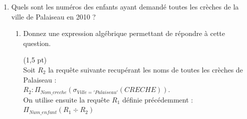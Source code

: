 \begin{enumerate}
  \begin{enumerate}
      \item Donnez une expression alg\'ebrique permettant de r\'epondre \`a cette
    question.
\begin{correction} (1 pt)\\
	Soit la requ\^ete $R$ suivante, jointure des relations $ENFANT$ et $ACCUEIL$:\\
      $R : ENFANT
      \Join_{ENFANT.Num\_enfant=ACCUEIL.Num\_enfant} ACCUEIL$\\
      Attention ici dans $R$, la
      jointure ne doit pas \^etre naturelle \`a cause de l'attribut \texttt{Annee} sur lequel on ne veut pas joindre !\\
      Une correction est $\pi_{Nom,Prenom}(\sigma_{ENFANT.Annee=2009}(R))$.\\
      ou \\ (avec renommage explicite pour pouvoir effectuer
      une jointure naturelle) : \\$\sigma_{Annee\_naiss=2009}(\rho_{Annee
      \rightarrow Annee\_naiss}(ENFANT) \Join ACCUEIL)$\\
  ou encore \\
      $\pi_{Nom,Prenom}(\pi_{Num\_enfant,
      Nom, Prenom}(\sigma_{Annee=2009}(ENFANT))) \Join ACCUEIL)$.
\end{correction} 
    \item Donnez une requ\^ete SQL permettant de
    r\'epondre \`a cette question.
\begin{correction} (1 pt)
      \begin{lstlisting}[language=SQL]
Select ENFANT.Nom, ACCUEIL.Prenom
From ENFANT, ACCUEIL
Where ENFANT.Num_enfant=ACCUEIL.Num_enfant and ENFANT.Annee=2009
      \end{lstlisting}
\end{correction}
  \end{enumerate}
 
   \item Quels sont les num\'eros des enfants ayant demand\'e toutes les
   cr\`eches de la ville de Palaiseau en 2010 ?
  \begin{enumerate}
      \item Donnez une expression alg\'ebrique permettant de
      r\'epondre \`a cette question.
\begin{correction} (1,5 pt)\\
	Soit $R_2$ la requ\^ete suivante recup\'erant les noms de toutes les cr\`eches
	de Palaiseau : \\
	$R_2 : \Pi_{Nom\_creche}(\sigma_{Ville='Palaiseau'}(CRECHE))$.\\
	On utilise ensuite la requ\^ete $R_1$ d\'efinie pr\'ec\'edemment :
	$\Pi_{Num\_enfant}(R_1 \div R_2)$ \\
\end{correction}


\end{enumerate}
\end{enumerate}
